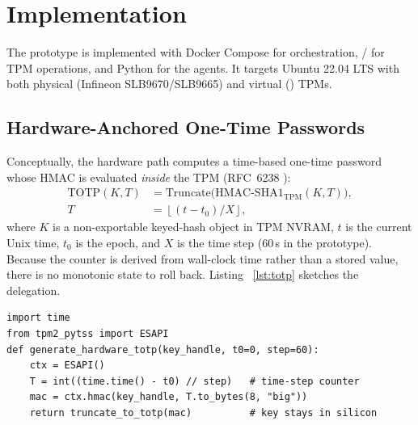 \documentclass[journal]{IEEEtran}
\newcommand{\ttcmd}[1]{\texttt{\seqsplit{#1}}}
\begin{document}
\section{Implementation}\label{sec:impl}
The prototype is implemented with Docker Compose for orchestration,
\ttcmd{tpm2-tools}/\ttcmd{tpm2-pytss} for TPM operations, and Python for the
agents. It targets Ubuntu 22.04 LTS with both physical
(Infineon SLB9670/SLB9665) and virtual (\ttcmd{swtpm}) TPMs.

\subsection{Hardware-Anchored One-Time Passwords}
Conceptually, the hardware path computes a time-based one-time password
whose HMAC is evaluated \emph{inside} the TPM (RFC~6238 \cite{rfc6238}):
\begin{equation}\label{eq:totp}
\begin{aligned}
\mathrm{TOTP}(K,T) &= \mathrm{Truncate}\big(\mathrm{HMAC\text{-}SHA1}_{\mathrm{TPM}}(K,T)\big),\\
T &= \left\lfloor (t - t_0)/X \right\rfloor,
\end{aligned}
\end{equation}
where $K$ is a non-exportable keyed-hash object in TPM NVRAM, $t$ is the
current Unix time, $t_0$ is the epoch, and $X$ is the time step ($60$\,s
in the prototype). Because the counter is derived from wall-clock time rather
than a stored value, there is no monotonic state to roll back. Listing~%
\ref{lst:totp} sketches the delegation.

\begin{lstlisting}[caption={Time-based HMAC delegated to the TPM; the key never leaves the chip.},label={lst:totp}]
import time
from tpm2_pytss import ESAPI
def generate_hardware_totp(key_handle, t0=0, step=60):
    ctx = ESAPI()
    T = int((time.time() - t0) // step)   # time-step counter
    mac = ctx.hmac(key_handle, T.to_bytes(8, "big"))
    return truncate_to_totp(mac)          # key stays in silicon
\end{lstlisting}
\end{document}
